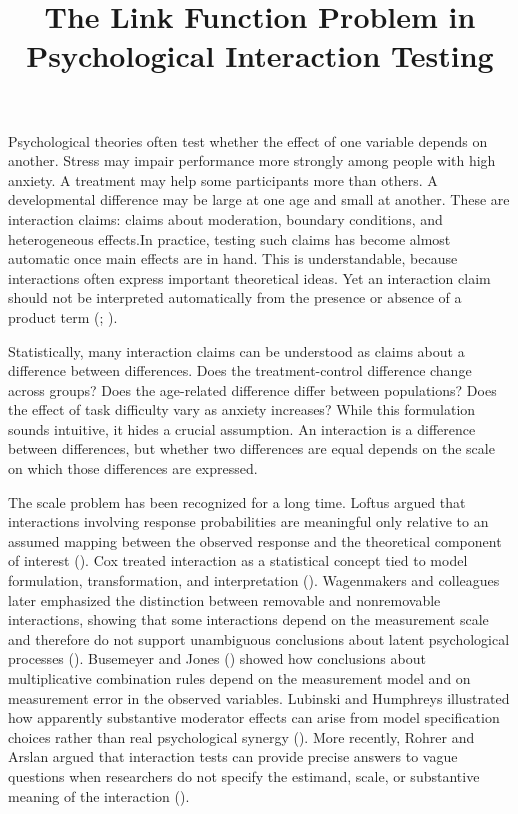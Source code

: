 \documentclass[
  man,
  longtable,
  nolmodern,
  notxfonts,
  notimes,
  colorlinks=true,linkcolor=blue,citecolor=blue,urlcolor=blue]{apa7}
\title{The Link Function Problem in Psychological Interaction Testing}
\begin{document}
\maketitle




\setlength\LTleft{0pt}




Psychological theories often test whether the effect of one variable
depends on another. Stress may impair performance more strongly among
people with high anxiety. A treatment may help some participants more
than others. A developmental difference may be large at one age and
small at another. These are interaction claims: claims about moderation,
boundary conditions, and heterogeneous effects.In practice, testing such
claims has become almost automatic once main effects are in hand. This
is understandable, because interactions often express important
theoretical ideas. Yet an interaction claim should not be interpreted
automatically from the presence or absence of a product term
(;
).

Statistically, many interaction claims can be understood as claims about
a difference between differences. Does the treatment-control difference
change across groups? Does the age-related difference differ between
populations? Does the effect of task difficulty vary as anxiety
increases? While this formulation sounds intuitive, it hides a crucial
assumption. An interaction is a difference between differences, but
whether two differences are equal depends on the scale on which those
differences are expressed.

The scale problem has been recognized for a long time. Loftus argued
that interactions involving response probabilities are meaningful only
relative to an assumed mapping between the observed response and the
theoretical component of interest (). Cox treated interaction as a statistical concept tied to model
formulation, transformation, and interpretation
(). Wagenmakers and colleagues later
emphasized the distinction between removable and nonremovable
interactions, showing that some interactions depend on the measurement
scale and therefore do not support unambiguous conclusions about latent
psychological processes (). Busemeyer and Jones ()
showed how conclusions about multiplicative combination rules depend on
the measurement model and on measurement error in the observed
variables. Lubinski and Humphreys illustrated how apparently substantive
moderator effects can arise from model specification choices rather than
real psychological synergy (). More recently, Rohrer and Arslan argued that
interaction tests can provide precise answers to vague questions when
researchers do not specify the estimand, scale, or substantive meaning
of the interaction ().
\end{document}
